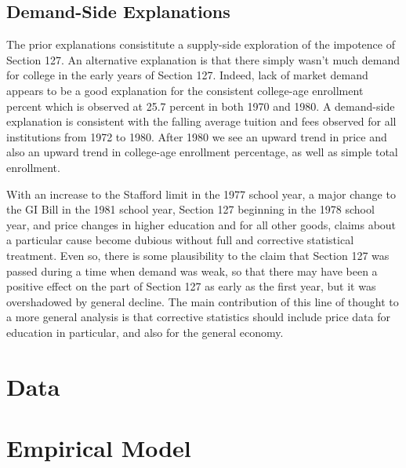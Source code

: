 \documentclass[review]{elsarticle}
\begin{document}
    \subsection{Demand-Side Explanations}
    The prior explanations consistitute a supply-side exploration of the impotence of Section 127.
    An alternative explanation is that there simply wasn't much demand for college in the early years of Section 127.
    Indeed, lack of market demand appears to be a good explanation for the consistent college-age enrollment percent
    which is observed at 25.7 percent in both 1970 and 1980.
    A demand-side explanation is consistent with the falling average tuition and fees observed for all institutions from 1972 to 1980.
    After 1980 we see an upward trend in price and also an upward trend in college-age enrollment percentage, as well as simple total enrollment.

    With an increase to the Stafford limit in the 1977 school year,
    a major change to the GI Bill in the 1981 school year,
    Section 127 beginning in the 1978 school year,
    and price changes in higher education and for all other goods,
    claims about a particular cause become dubious without full and corrective statistical treatment.
    Even so,
    there is some plausibility to the claim that Section 127 was passed during a time when demand was weak,
    so that there may have been a positive effect on the part of Section 127 as early as the first year,
    but it was overshadowed by general decline.
    The main contribution of this line of thought to a more general analysis is that corrective statistics should include price data
    for education in particular, and also for the general economy.

    \section{Data}

    \section{Empirical Model}
\end{document}
